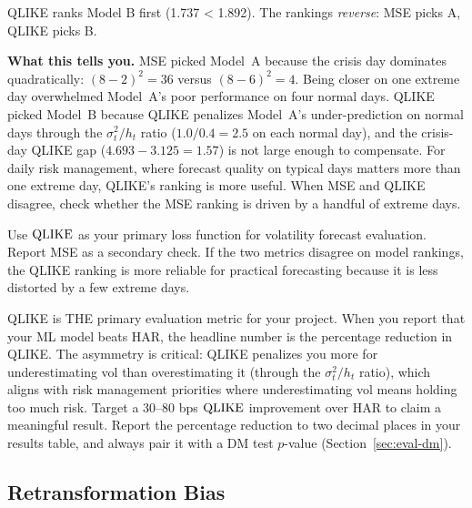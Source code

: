 \begin{workedexample}
QLIKE ranks Model B first (1.737 < 1.892).
The rankings \emph{reverse}: MSE picks A, QLIKE picks B.

\textbf{What this tells you.}
MSE picked Model~A because the crisis day dominates quadratically: $(8-2)^2 = 36$ versus $(8-6)^2 = 4$.
Being closer on one extreme day overwhelmed Model~A's poor performance on four normal days.
QLIKE picked Model~B because QLIKE penalizes Model~A's under-prediction on normal days through the $\sigma^2_t / h_t$ ratio ($1.0/0.4 = 2.5$ on each normal day), and the crisis-day QLIKE gap ($4.693 - 3.125 = 1.57$) is not large enough to compensate.
For daily risk management, where forecast quality on typical days matters more than one extreme day, QLIKE's ranking is more useful.
When MSE and QLIKE disagree, check whether the MSE ranking is driven by a handful of extreme days.
\end{workedexample}

\begin{keyidea}
Use $\operatorname{QLIKE}$ as your primary loss function for volatility forecast evaluation.
Report MSE as a secondary check.
If the two metrics disagree on model rankings, the QLIKE ranking is more reliable for practical forecasting because it is less distorted by a few extreme days.
\end{keyidea}

\begin{projectconnection}
QLIKE is THE primary evaluation metric for your project.
When you report that your ML model beats HAR, the headline number is the percentage reduction in QLIKE.
The asymmetry is critical: QLIKE penalizes you more for underestimating vol than overestimating it (through the $\sigma^2_t / h_t$ ratio), which aligns with risk management priorities where underestimating vol means holding too much risk.
Target a 30--80 bps $\operatorname{QLIKE}$ improvement over HAR to claim a meaningful result.
Report the percentage reduction to two decimal places in your results table, and always pair it with a DM test $p$-value (Section~\ref{sec:eval-dm}).
\end{projectconnection}


\subsection{Retransformation Bias}
\label{sec:eval-retransformation}

